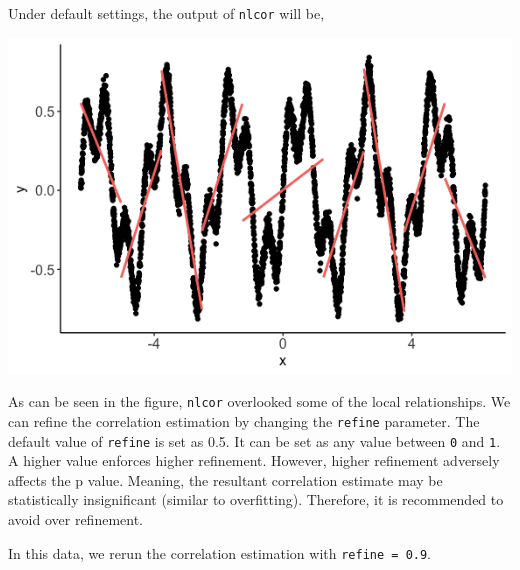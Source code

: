 \documentclass[]{article}
\newenvironment{Shaded}{\begin{snugshade}}{\end{snugshade}}
\newcommand{\CommentTok}[1]{\textcolor[rgb]{0.56,0.35,0.01}{\textit{#1}}}
\newcommand{\DataTypeTok}[1]{\textcolor[rgb]{0.13,0.29,0.53}{#1}}
\newcommand{\FloatTok}[1]{\textcolor[rgb]{0.00,0.00,0.81}{#1}}
\newcommand{\KeywordTok}[1]{\textcolor[rgb]{0.13,0.29,0.53}{\textbf{#1}}}
\newcommand{\NormalTok}[1]{#1}
\newcommand{\OperatorTok}[1]{\textcolor[rgb]{0.81,0.36,0.00}{\textbf{#1}}}
\newcommand{\StringTok}[1]{\textcolor[rgb]{0.31,0.60,0.02}{#1}}
\begin{document}
Under default settings, the output of \texttt{nlcor} will be,

\begin{Shaded}
\end{Shaded}

\begin{center}\includegraphics{README_files/figure-markdown_strict/Figure-3.2-1} \end{center}

As can be seen in the figure, \texttt{nlcor} overlooked some of the
local relationships. We can refine the correlation estimation by
changing the \texttt{refine} parameter. The default value of
\texttt{refine} is set as 0.5. It can be set as any value between
\texttt{0} and \texttt{1}. A higher value enforces higher refinement.
However, higher refinement adversely affects the p value. Meaning, the
resultant correlation estimate may be statistically insignificant
(similar to overfitting). Therefore, it is recommended to avoid over
refinement.

In this data, we rerun the correlation estimation with
\texttt{refine\ =\ 0.9}.

\begin{Shaded}
\end{Shaded}
\end{document}
